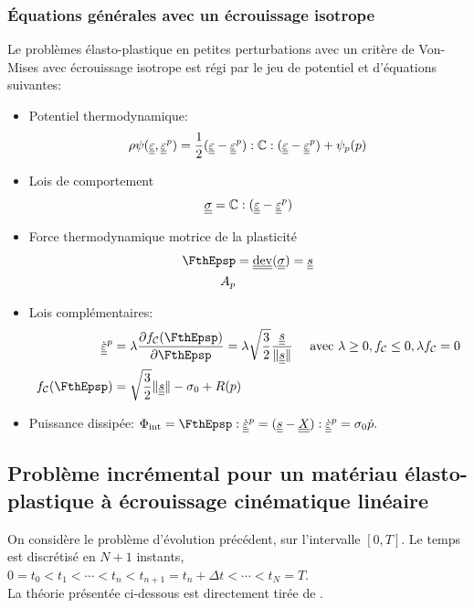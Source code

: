 \documentclass[10pt]{book}
\begin{document}
\begin{appendices}
\subsubsection{Équations générales avec un écrouissage isotrope}
Le problèmes élasto-plastique en petites perturbations avec un critère de Von-Mises avec écrouissage isotrope est régi par le jeu de potentiel et d'équations suivantes:
\begin{itemize}
\item Potentiel thermodynamique:
$$\rho \psi(\underline{\underline{\varepsilon}},\underline{\underline{\varepsilon}}^p)=\frac{1}{2}(\underline{\underline{\varepsilon}}-\underline{\underline{\varepsilon}}^p):\mathbb{C}:(\underline{\underline{\varepsilon}}-\underline{\underline{\varepsilon}}^p)+\psi_{p}(p)$$
\item Lois de comportement
$$\underline{\underline{\sigma}} =\mathbb{C}:(\underline{\underline{\varepsilon}}-\underline{\underline{\varepsilon}}^p)$$
\item Force thermodynamique motrice de la plasticité
$$\begin{aligned}
\FthEpsp&=\dev(\SC)=\devia\\
A_{p}
\end{aligned}$$
\item Lois complémentaires:
$$\begin{aligned}
\dot{\DefoHPP}^{p}&=\lambda\frac{\partial \FChargeConvexe(\FthEpsp)}{\partial \FthEpsp}=\lambda\sqrt{\frac{3}{2}}\frac{\devia}{\Vert \devia\Vert} \quad \avec \lambda\geq 0, \FChargeConvexe\leq 0, \lambda\FChargeConvexe=0\\
\FChargeConvexe(\FthEpsp)&=\sqrt{\frac{3}{2}}\Vert \devia\Vert-\sigma_{0}+R(p)
\end{aligned}$$
\item Puissance dissipée: $\dint=\FthEpsp:\dot{\DefoHPP}^{p}=(\devia-\TenTranslatDom):\dot{\DefoHPP}^{p}= \sigma_{0}\dot{p}.$
\end{itemize}
\subsection{Problème incrémental pour un matériau élasto-plastique à écrouissage cinématique linéaire}
On considère le problème d'évolution précédent, sur l'intervalle $[0,T]$. Le temps est discrétisé en $N+1$ instants, $0=t_{0}<t_{1} <\cdots<t_{n}<t_{n+1}=t_{n}+\Delta t<\cdots<t_{N}=T.$\\

La théorie présentée ci-dessous est directement tirée de \cite{maitournam2017materiaux}.\\


\end{appendices}
\end{document}
